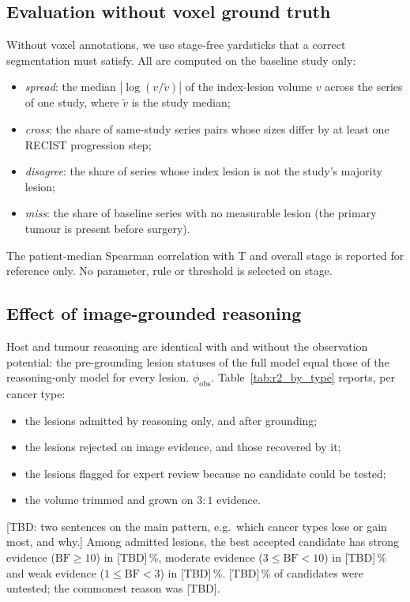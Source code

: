 \documentclass[fleqn,10pt]{olplainarticle}
\begin{document}
\subsection{Evaluation without voxel ground truth}
\label{sec:eval_protocol}
Without voxel annotations, we use stage-free yardsticks that a correct segmentation must satisfy. All are computed on
the baseline study only:
\begin{itemize}
  \item \emph{spread}: the median $|\log(v/\tilde v)|$ of the index-lesion volume $v$ across the series of one study,
  where $\tilde v$ is the study median;
  \item \emph{cross}: the share of same-study series pairs whose sizes differ by at least one RECIST progression step;
  \item \emph{disagree}: the share of series whose index lesion is not the study's majority lesion;
  \item \emph{miss}: the share of baseline series with no measurable lesion (the primary tumour is present before
  surgery).
\end{itemize}
The patient-median Spearman correlation with T and overall stage is reported for reference only. No parameter, rule
or threshold is selected on stage.

\subsection{Effect of image-grounded reasoning}
\label{sec:results_r2}
Host and tumour reasoning are identical with and without the observation potential: the pre-grounding lesion
statuses of the full model equal those of the reasoning-only model for every lesion.
$\phi_{\mathrm{obs}}$. Table~\ref{tab:r2_by_type} reports, per cancer type:
\begin{itemize}
  \item the lesions admitted by reasoning only, and after grounding;
  \item the lesions rejected on image evidence, and those recovered by it;
  \item the lesions flagged for expert review because no candidate could be tested;
  \item the volume trimmed and grown on $3{:}1$ evidence.
\end{itemize}
[TBD: two sentences on the main pattern, e.g.\ which cancer types lose or gain most, and why.]
Among admitted lesions, the best accepted candidate has strong evidence ($\mathrm{BF}\ge10$) in [TBD]\,\%, moderate
evidence ($3\le\mathrm{BF}<10$) in [TBD]\,\% and weak evidence ($1\le\mathrm{BF}<3$) in [TBD]\,\%. [TBD]\,\% of
candidates were untested; the commonest reason was [TBD].
\end{document}
